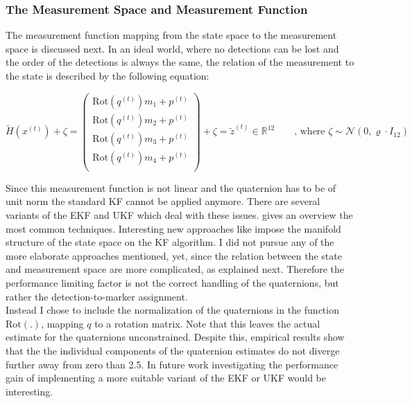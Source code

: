 \documentclass[12pt,a4paper]{article}
\begin{document}
\subsubsection{The Measurement Space and Measurement Function}
\label{measurements}
The measurement function mapping from the state space to the measurement space is discussed next. In an ideal world, where no detections can be lost and the order of the detections is always the same, the relation of the measurement to the state is described by the following equation:

\begin{equation}
\tilde{H}(x^{(t)}) + \zeta= \begin{pmatrix}
\text{Rot}(q^{(t)})m_1 + p^{(t)} \\
\text{Rot}(q^{(t)})m_2 + p^{(t)} \\
\text{Rot}(q^{(t)})m_3 + p^{(t)} \\
\text{Rot}(q^{(t)})m_4 + p^{(t)} \\
\end{pmatrix} + \zeta= \tilde{z}^{(t)} \in \mathbb{R}^{12} \qquad \text{, where } \zeta \sim \mathcal{N}(0, \varrho \cdot I_{12})
\end{equation}

Since this measurement function is not linear and the quaternion has to be of unit norm the standard KF cannot be applied anymore. There are several variants of the EKF and UKF which deal with these issues. \cite{attitude_estimation} gives an overview the most common techniques. Interesting new approaches like \cite{manifolds} impose the manifold structure of the state space on the KF algorithm. %
I did not pursue any of the more elaborate approaches mentioned, yet, since the relation between the state and measurement space are more complicated, as explained next. Therefore the performance limiting factor is not the correct handling of the quaternions, but rather the detection-to-marker assignment.\\
Instead I chose to include the normalization of the quaternions in the function $\text{Rot}(.)$, mapping $q$ to a rotation matrix. %
 Note that this leaves the actual estimate for the quaternions unconstrained. Despite this, empirical results show that the the individual components of the quaternion estimates do not diverge further away from zero than 2.5. In future work investigating the performance gain of implementing a more suitable variant of the EKF or UKF would be interesting.
\end{document}
